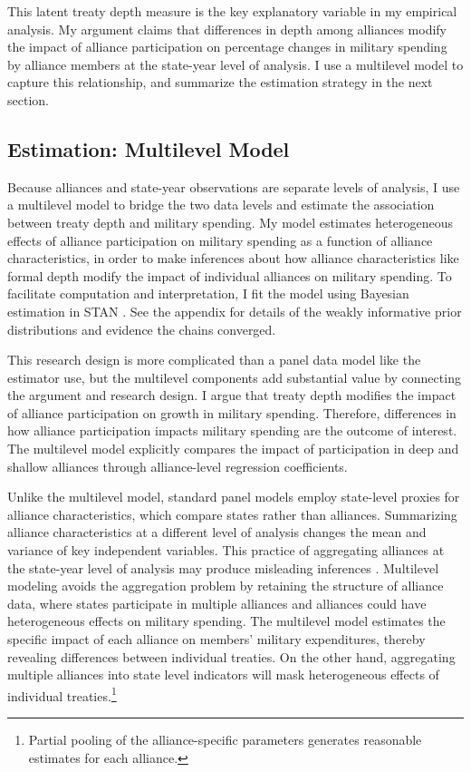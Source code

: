 \documentclass[12pt]{article}
\begin{document}
This latent treaty depth measure is the key explanatory variable in my empirical analysis. 
My argument claims that differences in depth among alliances modify the impact of alliance participation on percentage changes in military spending by alliance members at the state-year level of analysis. 
I use a multilevel model to capture this relationship, and summarize the estimation strategy in the next section. 


\subsection{Estimation: Multilevel Model} 


Because alliances and state-year observations are separate levels of analysis, I use a multilevel model to bridge the two data levels \citep{SteenbergenJones2002} and estimate the association between treaty depth and military spending. 
My model estimates heterogeneous effects of alliance participation on military spending as a function of alliance characteristics, in order to make inferences about how alliance characteristics like formal depth modify the impact of individual alliances on military spending.
To facilitate computation and interpretation, I fit the model using Bayesian estimation in STAN \citep{Carpenteretal2016}. 
See the appendix for details of the weakly informative prior distributions and evidence the chains converged.


This research design is more complicated than a panel data model like the estimator \citet{DigiuseppePoast2016} use, but the multilevel components add substantial value by connecting the argument and research design.
I argue that treaty depth modifies the impact of alliance participation on growth in military spending. 
Therefore, differences in how alliance participation impacts military spending are the outcome of interest.  
The multilevel model explicitly compares the impact of participation in deep and shallow alliances through alliance-level regression coefficients. 


Unlike the multilevel model, standard panel models employ state-level proxies for alliance characteristics, which compare states rather than alliances.
Summarizing alliance characteristics at a different level of analysis changes the mean and variance of key independent variables. 
This practice of aggregating alliances at the state-year level of analysis may produce misleading inferences \citep[pg. 356]{McElreath2016}.
Multilevel modeling avoids the aggregation problem by retaining the structure of alliance data, where states participate in multiple alliances and alliances could have heterogeneous effects on military spending.
The multilevel model estimates the specific impact of each alliance on members' military expenditures, thereby revealing differences between individual treaties. 
On the other hand, aggregating multiple alliances into state level indicators will mask heterogeneous effects of individual treaties.\footnote{Partial pooling of the alliance-specific parameters generates reasonable estimates for each alliance.} 
\end{document}
